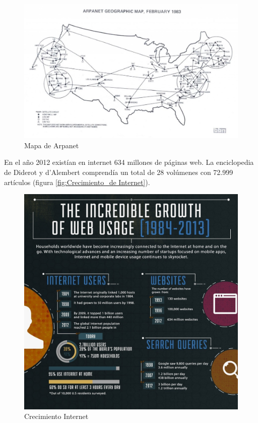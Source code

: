 \begin{figure}[hbtp]
\centering
\includegraphics[width=160mm, fbox={\fboxrule} 4mm]{images/introduccion/Mapa_de_Arpanet.jpg}
\caption{Mapa de Arpanet}
\label{fig:Arpanet}
\end{figure}


En el año 2012 existían en internet 634 millones de páginas web. La enciclopedia de Diderot y d'Alembert comprendía un total de 28 volúmenes con 72.999 artículos (figura \ref{fig:Crecimiento_de Internet}). %

\begin{figure}[hbtp]
\centering
\includegraphics[width=150mm, fbox={\fboxrule} 0pt]{images/introduccion/Grafico_paginas_web.jpg}
\caption{Crecimiento Internet}
\label{fig:Crecimiento_Internet}
\end{figure}


